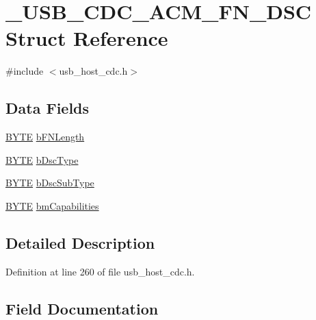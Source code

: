 \hypertarget{struct___u_s_b___c_d_c___a_c_m___f_n___d_s_c}{}\section{\+\_\+\+U\+S\+B\+\_\+\+C\+D\+C\+\_\+\+A\+C\+M\+\_\+\+F\+N\+\_\+\+D\+S\+C Struct Reference}
\label{struct___u_s_b___c_d_c___a_c_m___f_n___d_s_c}


{\ttfamily \#include $<$usb\+\_\+host\+\_\+cdc.\+h$>$}

\subsection*{Data Fields}
\begin{DoxyCompactItemize}
\item 
\hyperlink{_generic_type_defs_8h_a4ae1dab0fb4b072a66584546209e7d58}{B\+Y\+T\+E} \hyperlink{struct___u_s_b___c_d_c___a_c_m___f_n___d_s_c_a5cba7e463fbde92bb6daf4547a127a28}{b\+F\+N\+Length}
\item 
\hyperlink{_generic_type_defs_8h_a4ae1dab0fb4b072a66584546209e7d58}{B\+Y\+T\+E} \hyperlink{struct___u_s_b___c_d_c___a_c_m___f_n___d_s_c_a3641ecfd04e86c3ce95c6bed0c066a5d}{b\+Dsc\+Type}
\item 
\hyperlink{_generic_type_defs_8h_a4ae1dab0fb4b072a66584546209e7d58}{B\+Y\+T\+E} \hyperlink{struct___u_s_b___c_d_c___a_c_m___f_n___d_s_c_ac65bb2d41adfb877a46a2c45d2a1cb72}{b\+Dsc\+Sub\+Type}
\item 
\hyperlink{_generic_type_defs_8h_a4ae1dab0fb4b072a66584546209e7d58}{B\+Y\+T\+E} \hyperlink{struct___u_s_b___c_d_c___a_c_m___f_n___d_s_c_af373a8904dc7eab3ba5d57c69a7bbe01}{bm\+Capabilities}
\end{DoxyCompactItemize}


\subsection{Detailed Description}


Definition at line 260 of file usb\+\_\+host\+\_\+cdc.\+h.



\subsection{Field Documentation}
\hypertarget{struct___u_s_b___c_d_c___a_c_m___f_n___d_s_c_ac65bb2d41adfb877a46a2c45d2a1cb72}{}
